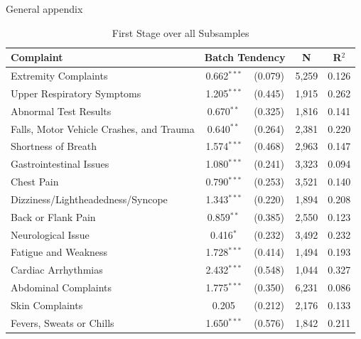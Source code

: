 \documentclass[,,nonblindrev]{informs}
\begin{document}
\begin{APPENDIX}{General appendix}
\begin{table}[htbp]
\centering
\caption{First Stage over all Subsamples}
\label{tab:monotonicitycheck}
\begin{tabular}{p{7cm}cccc}
\toprule
Complaint & \multicolumn{2}{c}{Batch Tendency} & N & R$^2$ \\
\midrule
Extremity Complaints & 0.662$^{***}$ & (0.079) & 5,259 & 0.126 \\
Upper Respiratory Symptoms & 1.205$^{***}$ & (0.445) & 1,915 & 0.262 \\
Abnormal Test Results & 0.670$^{**}$ & (0.325) & 1,816 & 0.141 \\
Falls, Motor Vehicle Crashes, and Trauma & 0.640$^{**}$ & (0.264) & 2,381 & 0.220 \\
Shortness of Breath & 1.574$^{***}$ & (0.468) &  2,963 & 0.147 \\
Gastrointestinal Issues & 1.080$^{***}$ & (0.241) & 3,323 & 0.094 \\
Chest Pain & 0.790$^{***}$ & (0.253) & 3,521 & 0.140 \\
Dizziness/Lightheadedness/Syncope & 1.343$^{***}$ & (0.220) & 1,894 & 0.208 \\
Back or Flank Pain & 0.859$^{**}$ & (0.385) &  2,550 & 0.123 \\
Neurological Issue & 0.416$^{*}$ & (0.232) &  3,492 & 0.232 \\
Fatigue and Weakness & 1.728$^{***}$ & (0.414) & 1,494 & 0.193 \\
Cardiac Arrhythmias & 2.432$^{***}$ & (0.548) & 1,044 & 0.327 \\
Abdominal Complaints & 1.775$^{***}$ & (0.350) & 6,231 & 0.086 \\
Skin Complaints & 0.205 & (0.212) & 2,176 & 0.133 \\
Fevers, Sweats or Chills & 1.650$^{***}$ & (0.576) &  1,842 & 0.211 \\
\bottomrule
\end{tabular}
\end{table}


\end{APPENDIX}
\end{document}
